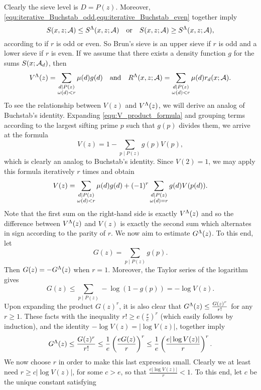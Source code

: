 \documentclass[12pt,oneside]{book}
\begin{document}
    Clearly the sieve level is $D = P(z)$. Moreover, \cref{equ:iterative_Buchstab_odd,equ:iterative_Buchstab_even} together imply
    \[
      S(x,z;\mathcal{A}) \le S^{\Lambda}(x,z;\mathcal{A}) \quad \text{or} \quad S(x,z;\mathcal{A}) \ge S^{\Lambda}(x,z;\mathcal{A}),
    \]
    according to if $r$ is odd or even. So Brun's sieve is an upper sieve if $r$ is odd and a lower sieve if $r$ is even. If we assume that there exists a density function $g$ for the sums $S(x;\mathcal{A}_{d})$, then
    \[
      V^{\Lambda}(z) = \sum_{\substack{d \mid P(z) \\ \omega(d) < r}}\mu(d)g(d) \quad \text{and} \quad R^{\Lambda}(x,z;\mathcal{A}) = \sum_{\substack{d \mid P(z) \\ \omega(d) < r}}\mu(d)r_{d}(x;\mathcal{A}).
    \]
    To see the relationship between $V(z)$ and $V^{\Lambda}(z)$, we will derive an analog of Buchstab's identity. Expanding \cref{equ:V_product_formula} and grouping terms according to the largest sifting prime $p$ such that $g(p)$ divides them, we arrive at the formula
    \[
      V(z) = 1-\sum_{p \mid P(z)}g(p)V(p),
    \]
    which is clearly an analog to Buchstab's identity. Since $V(2) = 1$, we may apply this formula iteratively $r$ times and obtain
    \[
      V(z) = \sum_{\substack{d \mid P(z) \\ \omega(d) < r}}\mu(d)g(d)+(-1)^{r}\sum_{\substack{d \mid P(z) \\ \omega(d) = r}}g(d)V(p(d)).
    \]
    Note that the first sum on the right-hand side is exactly $V^{\Lambda}(z)$ and so the difference between $V^{\Lambda}(z)$ and $V(z)$ is exactly the second sum which alternates in sign according to the parity of $r$. We now aim to estimate $G^{\Lambda}(z)$. To this end, let
    \[
      G(z) = \sum_{p \mid P(z)}g(p).
    \]
    Then $G(z) = -G^{\Lambda}(z)$ when $r = 1$. Moreover, the Taylor series of the logarithm gives
    \[
      G(z) \le \sum_{p \mid P(z)}-\log(1-g(p)) = -\log V(z).
    \]
    Upon expanding the product $G(z)^{r}$, it is also clear that $G^{\Lambda}(z) \le \frac{G(z)^{r}}{r!}$ for any $r \ge 1$. These facts with the inequality $r! \ge e\left(\frac{r}{e}\right)^{r}$ (which easily follows by induction), and the identity $-\log V(z) = |\log V(z)|$, together imply
    \begin{equation}\label{equ:Bruns_sieve_G_bound_1}
      G^{\Lambda}(z) \le \frac{G(z)^{r}}{r!} \le \frac{1}{e}\left(\frac{eG(z)}{r}\right)^{r} \le \frac{1}{e}\left(\frac{e|\log V(z)|}{r}\right)^{r}.
    \end{equation}
    We now choose $r$ in order to make this last expression small. Clearly we at least need $r \ge c|\log V(z)|$, for some $c > e$, so that $\frac{e|\log V(z)|}{r} < 1$. To this end, let $c$ be the unique constant satisfying
\end{document}
